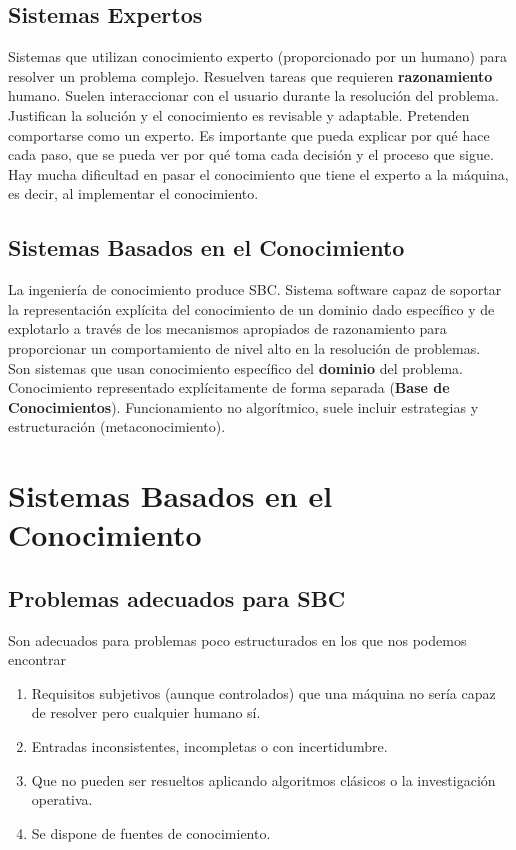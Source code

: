 \documentclass[12pt]{article}
\begin{document}
\subsection{Sistemas Expertos}
Sistemas que utilizan conocimiento experto (proporcionado por un humano) para resolver un problema complejo. Resuelven tareas que requieren \textbf{razonamiento} humano. Suelen interaccionar con el usuario durante la resolución del problema. Justifican la solución y el conocimiento es revisable y adaptable. Pretenden comportarse como un experto. Es importante que pueda explicar por qué hace cada paso, que se pueda ver por qué toma cada decisión y el proceso que sigue. Hay mucha dificultad en pasar el conocimiento que tiene el experto a la máquina, es decir, al implementar el conocimiento.

\subsection{Sistemas Basados en el Conocimiento}
La ingeniería de conocimiento produce SBC. Sistema software capaz de soportar la representación explícita del conocimiento de un dominio dado específico y de explotarlo a través de los mecanismos apropiados de razonamiento para proporcionar un comportamiento de nivel alto en la resolución de problemas.\\
Son sistemas que usan conocimiento específico del \textbf{dominio} del problema. Conocimiento representado explícitamente de forma separada (\textbf{Base de Conocimientos}). Funcionamiento no algorítmico, suele incluir estrategias y estructuración (metaconocimiento).

\section{Sistemas Basados en el Conocimiento}
\subsection{Problemas adecuados para SBC}
Son adecuados para problemas poco estructurados en los que nos podemos encontrar
\begin{enumerate}
\item Requisitos subjetivos (aunque controlados) que una máquina no sería capaz de resolver pero cualquier humano sí.
\item Entradas inconsistentes, incompletas o con incertidumbre.
\item Que no pueden ser resueltos aplicando algoritmos clásicos o la investigación operativa.
\item Se dispone de fuentes de conocimiento.
\end{enumerate}
\end{document}
